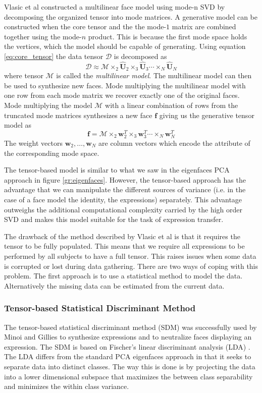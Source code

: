 \documentclass[11pt,a4paper,twoside]{report}
\begin{document}
Vlasic et al constructed a multilinear
face model using mode-n SVD by decomposing the organized tensor into mode
matrices. A generative model can be constructed when the core tensor and the the
mode-$1$ matrix are combined together using the mode-$n$ product. This is
because the first mode
space holds the vertices, which the model should be capable of generating. Using equation \ref{eq:core_tensor} the
data tensor $\mathcal{D}$ is decomposed as
\begin{equation} \label{eq:multilin_face}
\mathcal{D} \approx \mathcal{M} \times_2
\hat{\mathbf{U}}_2 \times_3 \hat{\mathbf{U}}_3 \dotsb \times_N \hat{\mathbf{U}}_N
\end{equation}
where tensor $\mathcal{M}$ is called the \textit{multilinear model}. The
multilinear model can then be used to synthesize new faces. Mode multiplying the
multilinear model with one row from
each mode matrix we recover exactly one of the original faces. Mode multiplying
the model $\mathcal{M}$ with a linear combination of rows from the truncated
mode matrices synthesizes a new face $\mathbf{f}$ giving us the generative
tensor model as
\begin{equation} \label{eq:generative_model}
\mathbf{f} = \mathcal{M} \times_2
\mathbf{w}_{2}^T \times_3 \mathbf{w}_3^T \dotsb \times_N \mathbf{w}_N^T
\end{equation}
The weight vectors $\mathbf{w}_{2}, \ldots ,\mathbf{w}_{N}$ are column vectors
which encode the attribute of the corresponding mode space.

The tensor-based model is
similar to what we saw in the eigenfaces PCA approach in figure
\ref{gr:eigenfaces}. However, the tensor-based approach has the advantage that
we can manipulate the different sources of variance (i.e. in the case of a face
model the identity, the
expressions) separately. This advantage outweighs the additional computational
complexity carried by the high order SVD and makes this model suitable for the
task of expression transfer.

The drawback of the method described by Vlasic et al is that it requires the
tensor to be fully populated. This means that we require all
expressions to be performed by all subjects to have a full tensor. This raises
issues when some data is corrupted or lost during data gathering. There are two
ways of coping with this problem. The first approach is to use a
statistical method to model the data. Alternatively the missing data can be estimated from the current data.
\subsubsection{Tensor-based Statistical Discriminant Method}
The tensor-based statistical discriminant method (SDM) was successfully used by Minoi and Gillies
\cite{sdm,jacey} to synthesize expressions and to neutralize faces displaying an
expression. The SDM is based on Fischer's linear discriminant analysis (LDA) \cite{lda}. The LDA
differs from the standard PCA eigenfaces approach in that it seeks to separate
data into distinct classes. The way this is done is by projecting the data into
a lower dimensional subspace that maximizes the between class separability and
minimizes the within class variance.
\end{document}
